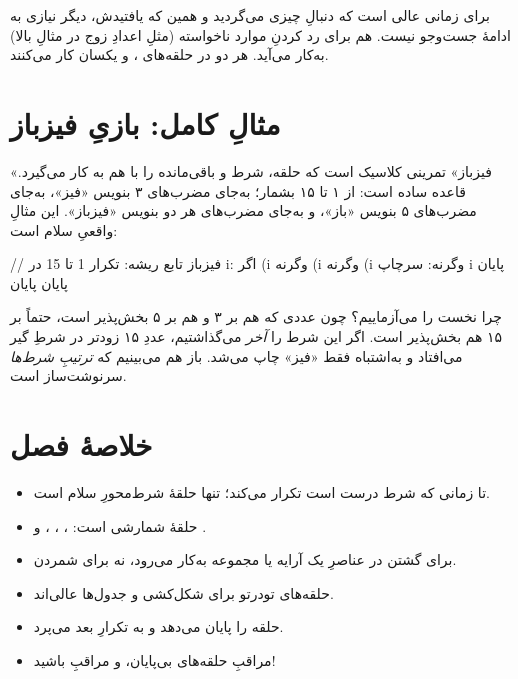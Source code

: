 \begin{tip}
 برای زمانی عالی است که دنبالِ چیزی می‌گردید و همین که یافتیدش، دیگر
نیازی به ادامهٔ جست‌وجو نیست.  هم برای رد کردنِ موارد ناخواسته
(مثلِ اعدادِ زوج در مثالِ بالا) به‌کار می‌آید. هر دو در حلقه‌های ،
 و  یکسان کار می‌کنند.
\end{tip}

\section{مثالِ کامل: بازیِ فیزباز}

«فیزباز» تمرینی کلاسیک است که حلقه، شرط و باقی‌مانده را با هم به کار می‌گیرد.
قاعده ساده است: از ۱ تا ۱۵ بشمار؛ به‌جای مضرب‌های ۳ بنویس «فیز»، به‌جای
مضرب‌های ۵ بنویس «باز»، و به‌جای مضرب‌های هر دو بنویس «فیزباز». این مثالِ واقعیِ
سلام است:

\begin{salamfa}
// فیزباز
تابع ریشه:
    تکرار 1 تا 15 در i:
        اگر (i %
        وگرنه (i %
        وگرنه (i %
        وگرنه:               سرچاپ i
        پایان
    پایان
پایان
\end{salamfa}

\begin{warn}
چرا نخست  را می‌آزماییم؟ چون عددی که هم بر ۳ و هم بر ۵
بخش‌پذیر است، حتماً بر ۱۵ هم بخش‌پذیر است. اگر این شرط را \emph{آخر}
می‌گذاشتیم، عددِ ۱۵ زودتر در شرطِ  گیر می‌افتاد و به‌اشتباه فقط
«فیز» چاپ می‌شد. باز هم می‌بینیم که \emph{ترتیبِ شرط‌ها} سرنوشت‌ساز است.
\end{warn}

\section{خلاصهٔ فصل}

\begin{itemize}
  \item {} تا زمانی که شرط درست است تکرار می‌کند؛ تنها حلقهٔ
        شرط‌محورِ سلام است.
  \item {} حلقهٔ شمارشی است: ، ،
        ،  و .
  \item {} برای گشتن در عناصرِ یک آرایه یا مجموعه
        به‌کار می‌رود، نه برای شمردن.
  \item حلقه‌های تودرتو برای شکل‌کشی و جدول‌ها عالی‌اند.
  \item {} حلقه را پایان می‌دهد و  به تکرارِ بعد می‌پرد.
  \item مراقبِ حلقه‌های بی‌پایان، و مراقبِ  باشید!
\end{itemize}

